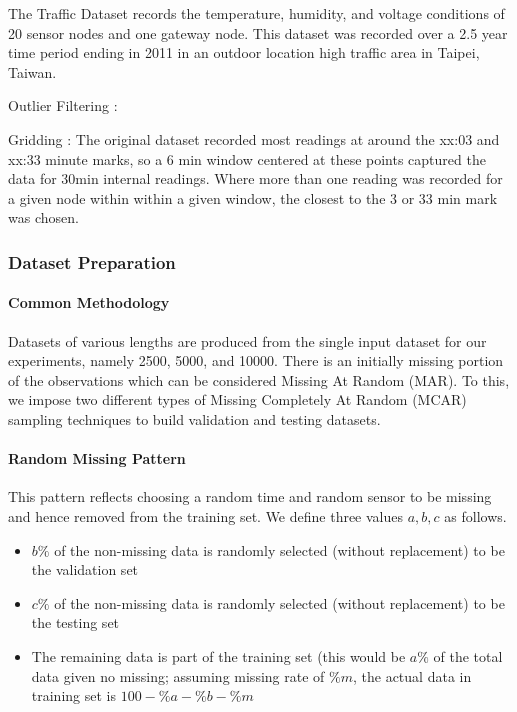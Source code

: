 The Traffic Dataset records the temperature, humidity, and voltage conditions of 20 sensor nodes and one gateway node.
This dataset was recorded over a 2.5 year time period ending in 2011 in an outdoor location high traffic area in Taipei, Taiwan.

Outlier Filtering : 

Gridding : The original dataset recorded most readings at around the xx:03 and xx:33 minute marks, so a 6 min window centered at
these points captured the data for 30min internal readings. Where more than one reading was recorded for a given node
within within a given window, the closest to the 3 or 33 min mark was chosen.

\subsubsection{Dataset Preparation}

\paragraph*{Common Methodology}

Datasets of various lengths are produced from the single input dataset for our experiments, namely 2500, 5000, and 10000.
There is an initially missing portion of the observations which can be considered Missing At Random (MAR).
To this, we impose two different types of Missing Completely At Random (MCAR) sampling techniques to build validation and testing datasets.

\paragraph*{Random Missing Pattern}

This pattern reflects choosing a random time and random sensor to be missing and hence removed from the training set.
We define three values $a, b, c$ as follows.

\begin{itemize}
\item $b\%$ of the non-missing data is randomly selected (without replacement) to be the validation set
\item $c\%$ of the non-missing data is randomly selected (without replacement) to be the testing set
\item The remaining data is part of the training set (this would be $a\%$ of the total data given no missing; assuming missing rate of $\%m$, the actual data in training set is $100-\%a-\%b-\%m$
\end{itemize}

